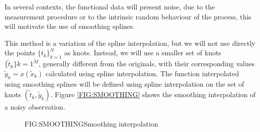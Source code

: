 In several contexts, the functional data will present noise, due to the
measurement procedure or to the intrinsic random behaviour of the process,
this will motivate the use of smoothing splines.

This method is a variation of the spline interpolation, but we will not
use directly the points $\{t_k\}_{k=1}^{N}$ as knots. Instead, we will use a
smaller set of knots $\{\tilde t_k\}{k=1}^{M}$, generally different from the
originals, with their corresponding values $\tilde y_k = x(\tilde x_k)$
calculated using spline interpolation. The function interpolated using smoothing
splines will be defined using spline interpolation on the set of knots
$(\tilde t_k, \tilde y_k)$. Figure \ref{FIG:SMOOTHING} shows the smoothing
interpolation of a noisy observation.

\begin{figure}[Example of smoothing spline interpolation]{FIG:SMOOTHING}{Smoothing interpolation}
\end{figure}
